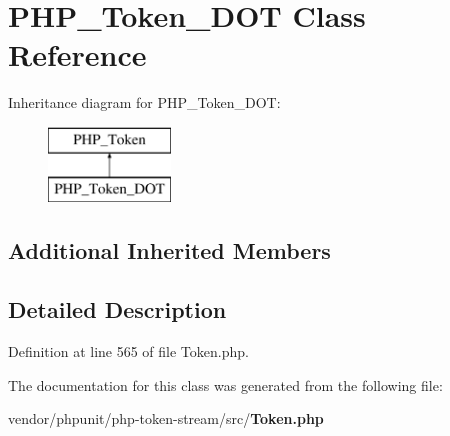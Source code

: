 \section{P\+H\+P\+\_\+\+Token\+\_\+\+D\+O\+T Class Reference}
\label{class_p_h_p___token___d_o_t}
Inheritance diagram for P\+H\+P\+\_\+\+Token\+\_\+\+D\+O\+T\+:\begin{figure}[H]
\begin{center}
\leavevmode
\includegraphics[height=2.000000cm]{class_p_h_p___token___d_o_t}
\end{center}
\end{figure}
\subsection*{Additional Inherited Members}


\subsection{Detailed Description}


Definition at line 565 of file Token.\+php.



The documentation for this class was generated from the following file\+:\begin{DoxyCompactItemize}
\item 
vendor/phpunit/php-\/token-\/stream/src/{\bf Token.\+php}\end{DoxyCompactItemize}
